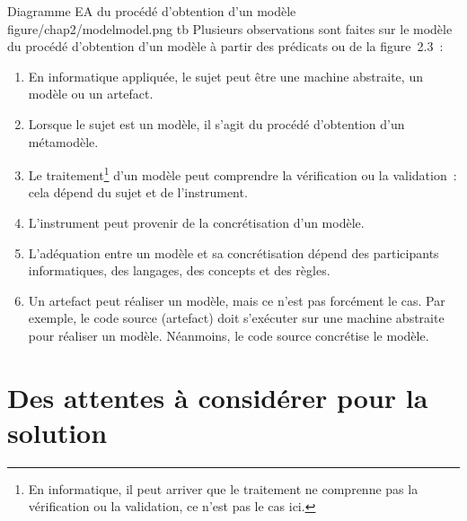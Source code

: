 {\figmedium
{Diagramme EA du procédé d'obtention d'un modèle}
{figure/chap2/modelmodel.png}
{}{}{}{tb}
Plusieurs observations sont faites sur le modèle du procédé d'obtention d'un modèle à partir des prédicats ou de la figure~2.3~:
\begin{enumerate}[label=\alph*)]
    \item En informatique appliquée, le sujet peut être une machine abstraite, un modèle ou un artefact.
    \item Lorsque le sujet est un modèle, il s'agit du procédé d'obtention d'un métamodèle.
    \item Le traitement\footnote{En informatique, il peut arriver que le traitement ne comprenne pas la vérification ou la validation, ce n'est pas le cas ici.} d'un modèle peut comprendre la vérification ou la validation~: cela dépend du sujet et de l'instrument.
    \item L'instrument peut provenir de la concrétisation d'un modèle.
    \item L'adéquation entre un modèle et sa concrétisation dépend des participants informatiques, des langages, des concepts et des règles.
    \item Un artefact peut réaliser un modèle, mais ce n'est pas forcément le cas. Par exemple, le code source (artefact) doit s'exécuter sur une machine abstraite pour réaliser un modèle. Néanmoins, le code source concrétise le modèle.
\end{enumerate}
\leavevmode\vspace{-\baselineskip}
}{}{}

\section{Des attentes à considérer pour la solution}


